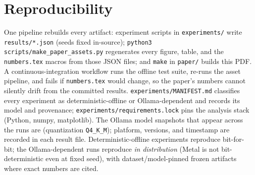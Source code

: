 \documentclass[11pt]{article}
\begin{document}
\section{Reproducibility}
One pipeline rebuilds every artifact: experiment scripts in
\texttt{experiments/} write \texttt{results/*.json} (seeds fixed in-source);
\texttt{python3 scripts/make\_paper\_assets.py} regenerates every figure,
table, and the \texttt{numbers.tex} macros from those JSON files; and
\texttt{make} in \texttt{paper/} builds this PDF. A continuous-integration
workflow runs the offline test suite, re-runs the asset pipeline, and fails if
\texttt{numbers.tex} would change, so the paper's numbers cannot silently drift
from the committed results. \texttt{experiments/MANIFEST.md} classifies every
experiment as deterministic-offline or Ollama-dependent and records its model and
provenance; \texttt{experiments/requirements.lock} pins the analysis stack
(Python, numpy, matplotlib). The \NumModels{} Ollama model snapshots that appear
across the runs are \ModelList{} (quantization \texttt{Q4\_K\_M}); platform,
versions, and timestamp are recorded in each result file. Deterministic-offline
experiments reproduce bit-for-bit; the Ollama-dependent runs reproduce
\emph{in distribution} (Metal is not bit-deterministic even at fixed seed), with
dataset/model-pinned frozen artifacts where exact numbers are cited.

\clearpage



\end{document}
